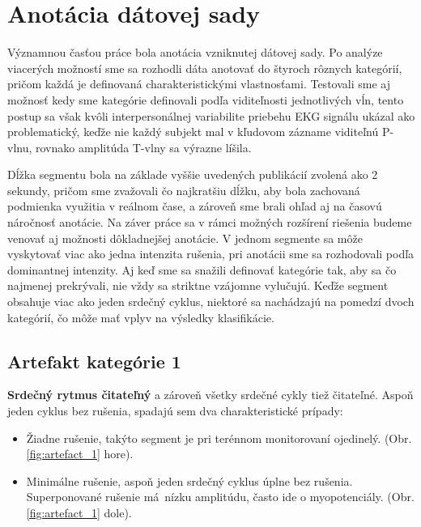 \section{Anotácia dátovej sady}

Významnou časťou práce bola anotácia vzniknutej dátovej sady. Po analýze viacerých možností sme sa rozhodli dáta anotovať do štyroch rôznych kategórií, pričom každá je definovaná charakteristickými vlastnosťami. Testovali sme aj možnosť kedy sme kategórie definovali podľa viditeľnosti jednotlivých vĺn, tento postup sa však kvôli interpersonálnej variabilite priebehu EKG signálu ukázal ako problematický, keďže nie každý subjekt mal v kľudovom zázname viditeľnú P-vlnu, rovnako amplitúda T-vlny sa výrazne líšila.

Dĺžka segmentu bola na základe vyššie uvedených publikácií zvolená ako 2 sekundy, pričom sme zvažovali čo najkratšiu dĺžku, aby bola zachovaná podmienka využitia v reálnom čase, a zároveň sme brali ohľad aj na časovú náročnosť anotácie. Na záver práce sa v rámci možných rozšírení riešenia budeme venovať aj možnosti dôkladnejšej anotácie. V jednom segmente sa môže vyskytovať viac ako jedna intenzita rušenia, pri anotácii sme sa rozhodovali podľa dominantnej intenzity. Aj keď sme sa snažili definovať kategórie tak, aby sa čo najmenej prekrývali, nie vždy sa striktne vzájomne vylučujú. Keďže segment obsahuje viac ako jeden srdečný cyklus, niektoré sa nachádzajú na pomedzí dvoch kategórií, čo môže mať vplyv na výsledky klasifikácie. 

\newpage

\subsection{Artefakt kategórie 1}

\textbf{Srdečný rytmus čitateľný} a zároveň všetky srdečné cykly tiež čitateľné. Aspoň jeden cyklus bez rušenia, spadajú sem dva charakteristické prípady:

\begin{itemize}
    \item Žiadne rušenie, takýto segment je pri terénnom monitorovaní ojedinelý. (Obr. \ref{fig:artefact_1} hore).
    \item Minimálne rušenie, aspoň jeden srdečný cyklus úplne bez rušenia. Superponované rušenie má~nízku amplitúdu, často ide o myopotenciály. (Obr. \ref{fig:artefact_1} dole). 
\end{itemize}

